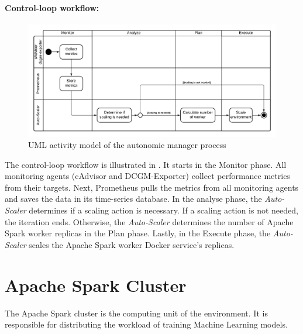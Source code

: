 \paragraph{Control-loop workflow:}
\begin{figure}[h]
\centering
\includegraphics[scale=0.50]{images/05_conceptual_design/autonomic_manager/autonomic_manager_workflow}
\caption{UML activity model of the autonomic manager process}
\label{fig:05_am_monitoring_loop_workflow}
\end{figure}
The control-loop workflow is illustrated in .
It starts in the Monitor phase. All monitoring agents (cAdvisor and DCGM-Exporter) collect performance metrics from their targets. Next, Prometheus pulls the metrics from all monitoring agents and saves the data in its time-series database.
In the analyse phase, the \textit{Auto-Scaler} determines if a scaling action is necessary. If a scaling action is not needed, the iteration ends.
Otherwise, the \textit{Auto-Scaler} determines the number of Apache Spark worker replicas in the Plan phase.
Lastly, in the Execute phase, the \textit{Auto-Scaler} scales the Apache Spark worker Docker service's replicas.


\section{Apache Spark Cluster}
\label{sec:05_spark}
The Apache Spark cluster is the computing unit of the environment. It is responsible for distributing the workload of training Machine Learning models.

